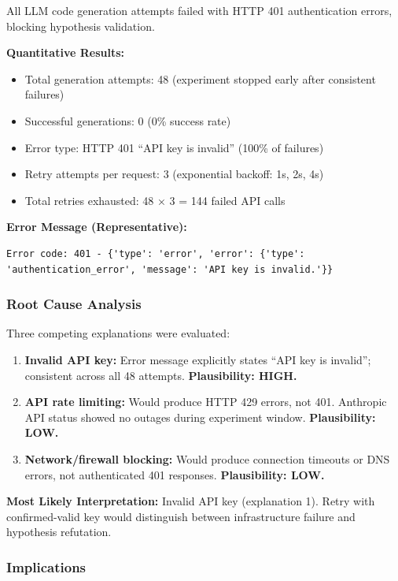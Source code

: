 All LLM code generation attempts failed with HTTP 401 authentication errors, blocking hypothesis validation.

\textbf{Quantitative Results:}
\begin{itemize}
\item Total generation attempts: 48 (experiment stopped early after consistent failures)
\item Successful generations: 0 (0\% success rate)
\item Error type: HTTP 401 ``API key is invalid'' (100\% of failures)
\item Retry attempts per request: 3 (exponential backoff: 1s, 2s, 4s)
\item Total retries exhausted: 48 × 3 = 144 failed API calls
\end{itemize}

\textbf{Error Message (Representative):}
\begin{verbatim}
Error code: 401 - {'type': 'error', 'error': {'type':
'authentication_error', 'message': 'API key is invalid.'}}
\end{verbatim}

\subsubsection{Root Cause Analysis}

Three competing explanations were evaluated:

\begin{enumerate}
\item \textbf{Invalid API key:} Error message explicitly states ``API key is invalid''; consistent across all 48 attempts. \textbf{Plausibility: HIGH.}

\item \textbf{API rate limiting:} Would produce HTTP 429 errors, not 401. Anthropic API status showed no outages during experiment window. \textbf{Plausibility: LOW.}

\item \textbf{Network/firewall blocking:} Would produce connection timeouts or DNS errors, not authenticated 401 responses. \textbf{Plausibility: LOW.}
\end{enumerate}

\textbf{Most Likely Interpretation:} Invalid API key (explanation 1). Retry with confirmed-valid key would distinguish between infrastructure failure and hypothesis refutation.

\subsubsection{Implications}

